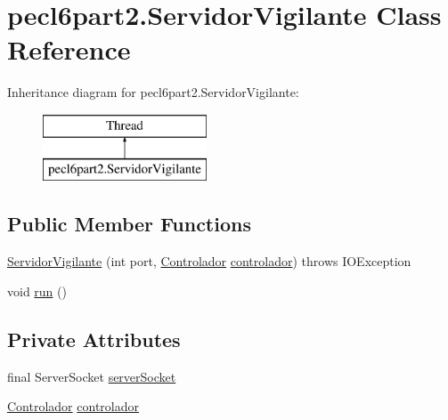 \hypertarget{classpecl6part2_1_1_servidor_vigilante}{}\section{pecl6part2.\+Servidor\+Vigilante Class Reference}
\label{classpecl6part2_1_1_servidor_vigilante}
Inheritance diagram for pecl6part2.\+Servidor\+Vigilante\+:\begin{figure}[H]
\begin{center}
\leavevmode
\includegraphics[height=2.000000cm]{classpecl6part2_1_1_servidor_vigilante}
\end{center}
\end{figure}
\subsection*{Public Member Functions}
\begin{DoxyCompactItemize}
\item 
\mbox{\hyperlink{classpecl6part2_1_1_servidor_vigilante_aec607bf37f7f8fe1c8ff1e6c36d5c3ca}{Servidor\+Vigilante}} (int port, \mbox{\hyperlink{classpecl6part2_1_1_controlador}{Controlador}} \mbox{\hyperlink{classpecl6part2_1_1_servidor_vigilante_a74b80f98c6625e80f95d1d1bfd0c49cc}{controlador}})  throws I\+O\+Exception 
\item 
void \mbox{\hyperlink{classpecl6part2_1_1_servidor_vigilante_a5bb0ef0a09a59f8d1589fa851085f190}{run}} ()
\end{DoxyCompactItemize}
\subsection*{Private Attributes}
\begin{DoxyCompactItemize}
\item 
final Server\+Socket \mbox{\hyperlink{classpecl6part2_1_1_servidor_vigilante_aaa40cd2b5cc8c603c6dce1d8a440aca6}{server\+Socket}}
\item 
\mbox{\hyperlink{classpecl6part2_1_1_controlador}{Controlador}} \mbox{\hyperlink{classpecl6part2_1_1_servidor_vigilante_a74b80f98c6625e80f95d1d1bfd0c49cc}{controlador}}
\end{DoxyCompactItemize}


